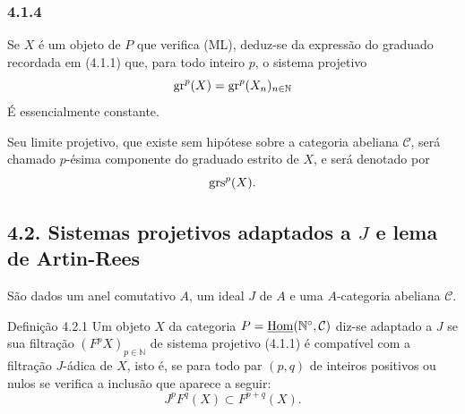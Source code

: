 \subsubsection*{4.1.4}
Se $X$ é um objeto de \(P\) que verifica (ML), deduz-se da expressão do graduado recordada em (4.1.1) que, para todo inteiro \(p\), o sistema projetivo
\[
\operatorname{gr}^p(X)=\operatorname{gr}^p(X_n)_{n\in\mathbb N}
\]
É essencialmente constante.

Seu limite projetivo, que existe sem hipótese sobre a categoria abeliana \(\mathcal C\), será chamado \(p\)-ésima componente do graduado estrito de \(X\), e será denotado por
\[
\operatorname{grs}^p(X).
\]

\subsection*{4.2. Sistemas projetivos adaptados a \(J\) e lema de Artin-Rees}

São dados um anel comutativo \(A\), um ideal \(J\) de \(A\) e uma \(A\)-categoria abeliana \(\mathcal C\).

\begin{statement}{Definição 4.2.1}
Um objeto \(X\) da categoria \(P=\underline{\operatorname{Hom}}(\mathbb N^\circ,\mathcal C)\) diz-se adaptado a \(J\) se sua filtração \((F^pX)_{p\in\mathbb N}\) de sistema projetivo (4.1.1) é compatível com a filtração \(J\)-ádica de \(X\), isto é, se para todo par \((p,q)\) de inteiros positivos ou nulos se verifica a inclusão que aparece a seguir:
\[
J^pF^q(X)\subset F^{p+q}(X).
\]
\end{statement}
